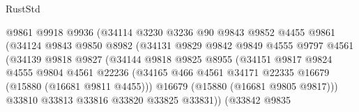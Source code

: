 \begin{lexlean}{RustStd}
\begin{coremodule}
                                  @9861
                                  @9918
                                  @9936
                                  (@34114
                                    @3230
                                    @3236
                                    @90
                                    @9843
                                    @9852
                                    @4455
                                    @9861
                                    (@34124
                                      @9843
                                      @9850
                                      @8982
                                      (@34131
                                        @9829
                                        @9842
                                        @9849
                                        @4555
                                        @9797
                                        @4561
                                        (@34139
                                          @9818
                                          @9827
                                          (@34144
                                            @9818
                                            @9825
                                            @8955
                                            (@34151
                                              @9817
                                              @9824
                                              @4555
                                              @9804
                                              @4561
                                              @22236
                                              (@34165
                                                @466
                                                @4561
                                                @34171
                                                @22335
                                                @16679
                                                (@15880 (@16681 @9811 @4455)))
                                              @16679
                                              (@15880 (@16681 @9805 @9817)))
                                            @33810
                                            @33813
                                            @33816
                                            @33820
                                            @33825
                                            @33831))
                                        (@33842
                                          @9835

\end{coremodule}
\end{lexlean}
